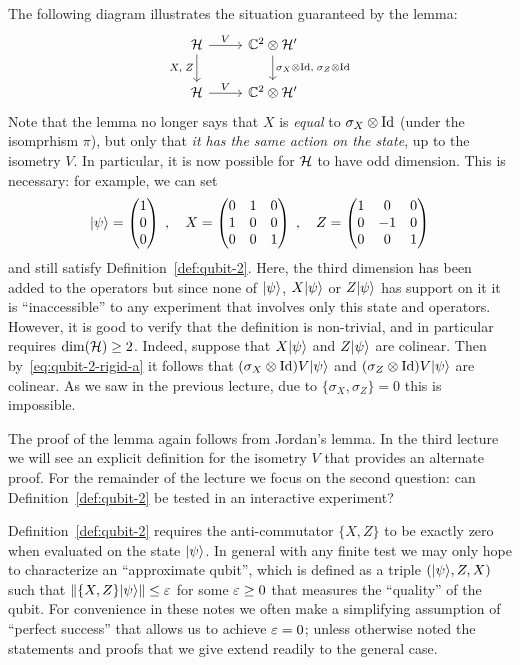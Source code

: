 The following diagram illustrates the situation guaranteed by the lemma:
\begin{equation}\label{diag:one-qubit}
\begin{tikzcd}
\mH \arrow{r}{V} \arrow[swap]{d}{X,\; Z} & \C^2 \otimes \mH' \arrow{d}{\sigma_X\otimes \Id,\; \sigma_Z\otimes \Id} \\
\mH \arrow{r}{V} & \C^2 \otimes \mH'
\end{tikzcd}
\end{equation}
Note that the lemma no longer says that $X$ is \emph{equal} to $\sigma_X \otimes \mathop{\rm Id}\nolimits$ (under the isomprhism $\pi$), but only that \emph{it has the same action on the state}, up to the isometry $V$. In particular, it is now possible for $\mathcal{H}$ to have odd dimension. This is necessary: for example, we can set
\[ |\psi\rangle = \begin{pmatrix} 1 \\ 0 \\ 0 \end{pmatrix}\;,\quad X = \begin{pmatrix} 0 & 1 & 0 \\ 1 & 0 & 0 \\ 0 & 0 & 1 \end{pmatrix}\;,\quad Z =  \begin{pmatrix} 1 & 0 & 0 \\ 0 & -1 & 0 \\ 0 & 0 & 1 \end{pmatrix}\]
and still satisfy Definition~\ref{def:qubit-2}.  Here, the third dimension has been added to the operators but since none of $|\psi\rangle$, $X|\psi\rangle$ or $Z|\psi\rangle$ has support on it it is ``inaccessible'' to any experiment that involves only this state and operators. However, it is good to verify that the definition is non-trivial, and in particular requires $\dim(\mathcal{H})\geq 2$. Indeed, suppose that $X|\psi\rangle$ and $Z|\psi\rangle$ are colinear. Then by~\eqref{eq:qubit-2-rigid-a} it follows that $(\sigma_X\otimes \mathop{\rm Id}\nolimits)V|\psi\rangle$ and $(\sigma_Z\otimes \mathop{\rm Id}\nolimits)V|\psi\rangle$ are colinear. As we saw in the previous lecture, due to $\{\sigma_X,\sigma_Z\}=0$ this is impossible. 

The proof of the lemma again follows from Jordan's lemma. In the third lecture we will see an explicit definition for the isometry $V$ that provides an alternate proof. For the remainder of the lecture we focus on the second question: can Definition~\ref{def:qubit-2} be tested in an interactive experiment? 

\begin{remark}
Definition~\ref{def:qubit-2} requires the anti-commutator $\{X,Z\}$ to be exactly zero when evaluated on the state $|\psi\rangle$. In general with any finite test we may only hope to characterize an ``approximate qubit'', which is defined as a triple $(|\psi\rangle,Z,X)$ such that $\|\{X,Z\}|\psi\rangle\|\leq \varepsilon$ for some $\varepsilon\geq 0$ that measures the ``quality'' of the qubit. For convenience in these notes we often make a simplifying assumption of ``perfect success'' that allows us to achieve $\varepsilon=0$; unless otherwise noted the statements and proofs that we give  extend readily to the general case.
\end{remark}


